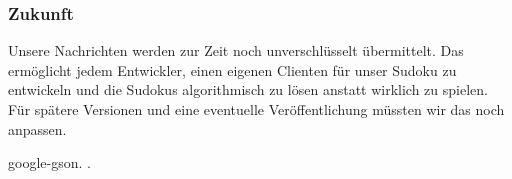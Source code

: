 \subsubsection{Zukunft}

Unsere Nachrichten werden zur Zeit noch unverschlüsselt übermittelt. Das ermöglicht jedem Entwickler, einen eigenen Clienten für unser Sudoku zu entwickeln und die Sudokus algorithmisch zu lösen anstatt wirklich zu spielen. Für spätere Versionen und eine eventuelle Veröffentlichung müssten wir das noch anpassen. 


{google-gson}.
.
